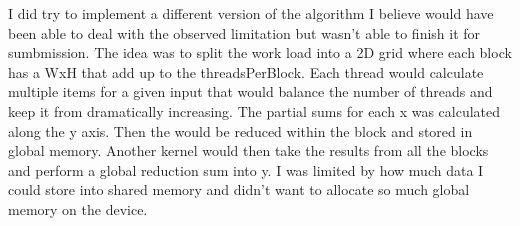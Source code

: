 \documentclass[11pt,a4paper]{article}
\begin{document}
I did try to implement a different version of the algorithm I believe would have been able to deal with the observed limitation but wasn't able to finish it for sumbmission. The idea was to split the work load into a 2D grid where each block has a WxH that add up to the threadsPerBlock. Each thread would calculate multiple items for a given input that would balance the number of threads and keep it from dramatically increasing. The partial sums for each x was calculated along the y axis. Then the would be reduced within the block and stored in global memory. Another kernel would then take the results from all the blocks and perform a global reduction sum into y. I was limited by how much data I could store into shared memory and didn't want to allocate so much global memory on the device. 
\end{document}
